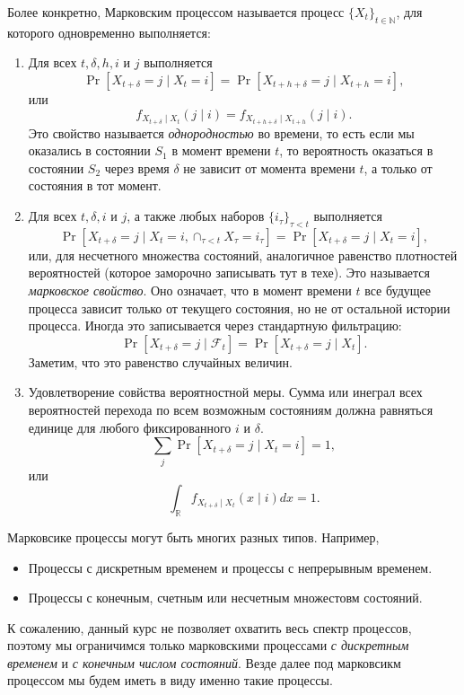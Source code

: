 \documentclass[12pt]{article}
\newcommand\N{\mathbb{N}}
\newcommand\R{\mathbb{R}}
\newcommand\F{\mathcal{F}}
\begin{document}
Более конкретно, Марковским процессом называется процесс $\{X_t\}_{t \in \N}$, для которого одновременно выполняется:
\begin{enumerate}
  \item Для всех $t, \delta, h, i$ и $j$ выполняется \[\Pr[X_{t + \delta} = j \mid X_t = i] = \Pr[X_{t + h + \delta} = j \mid X_{t + h} = i],\] или \[f_{X_{t + \delta} \mid X_t}(j \mid i) = f_{X_{t + h + \delta} \mid X_{t + h}}(j \mid i).\] 
  Это свойство называется \emph{однородностью} во времени, то есть если мы оказались в состоянии $S_1$ в момент времени $t$, то вероятность оказаться в состоянии $S_2$ через время $\delta$ не зависит от момента времени $t$, а только от состояния в тот момент.
  \item Для всех $t, \delta, i$ и $j$, а также любых наборов $\{i_\tau\}_{\tau < t}$ выполняется \[\Pr[X_{t + \delta} = j \mid X_t = i, \cap_{\tau < t} X_\tau = i_\tau] = \Pr[X_{t + \delta} = j \mid X_t = i], \] или, для несчетного множества состояний, аналогичное равенство плотностей вероятностей (которое заморочно записывать тут в техе).
  Это называется \emph{марковское свойство}. Оно означает, что в момент времени $t$ все будущее процесса зависит только от текущего состояния, но не от остальной истории процесса. Иногда это записывается через стандартную фильтрацию:
  \[\Pr[X_{t + \delta} = j \mid \F_t] = \Pr[X_{t + \delta} = j \mid X_t]. \]
  Заметим, что это равенство случайных величин.
  \item Удовлетворение совйства вероятностной меры. Сумма или инеграл всех вероятностей перехода по всем возможным состояниям должна равняться единице для любого фиксированного $i$ и $\delta$.
  \[ \sum_j \Pr[X_{t + \delta} = j \mid X_t = i] = 1,\]
  или
  \[ \int_\R f_{X_{t + \delta} \mid X_t}(x \mid i) dx = 1. \]
\end{enumerate}

Марковсике процессы могут быть многих разных типов. Например,
\begin{itemize}
  \item Процессы с дискретным временем и процессы с непрерывным временем.
  \item Процессы с конечным, счетным или несчетным множестовм состояний.
\end{itemize}

К сожалению, данный курс не позволяет охватить весь спектр процессов, поэтому мы ограничимся только марковскими процессами \emph{с дискретным временем} и \emph{с конечным числом состояний}. Везде далее под марковсикм процессом мы будем иметь в виду именно такие процессы.
\end{document}

